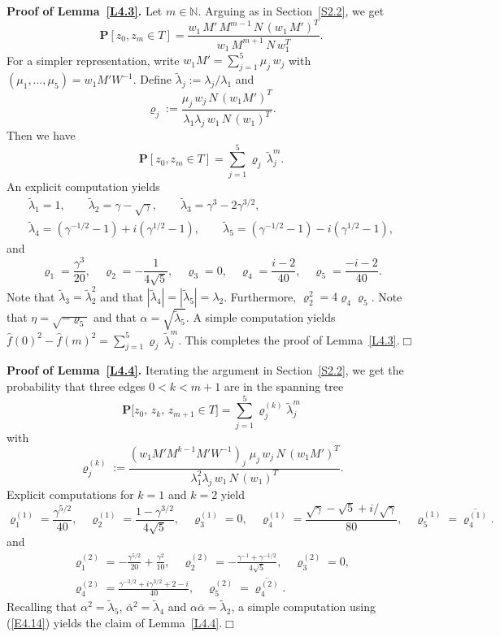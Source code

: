 \documentclass[11pt]{article}
\providecommand{\1}{\mathBB{1}}
\renewcommand{\P}{\mathbf{P}}
\newcommand{\N}{{\mathbb{N}}}
\def\hatf{\widehat f}
\newcommand{\equ}[1]{(\ref{#1})}
\providecommand{\eop}{{}\hfill {}\hfill{$\Box
$}\vspace{0.3cm}\pagebreak[2]\par}
\begin{document}
\textbf{Proof of Lemma~\ref{L4.3}.}
Let $m\in\N$.
Arguing as in Section~\ref{S2.2}, we get
\begin{equation}
\label{E4.13}
\P[z_0,z_m\in T]
=\frac{w_1\,M'\,M^{m-1}\,N\,(w_1\,M')^T}{w_1\,M^{m+1}\,N\,w_1^T}.
\end{equation}
For a simpler representation, write
$w_1M'=\sum_{j=1}^5\mu_j\,w_j$
with
$(\mu_1,\ldots,\mu_5)=w_1M'W^{-1}$.
Define $\tilde\lambda_j:=\lambda_j/\lambda_1$ and
$$\varrho_j:=
\frac{\mu_j\,w_j\,N\,(w_1M')^T}
{\lambda_1\lambda_j\,w_1\,N\,(w_1)^T}.
$$
Then we have
$$
\P[z_0,z_m\in T]=\sum_{j=1}^5\varrho_j\,\tilde\lambda_j^m.
$$
An explicit computation yields
$$\begin{gathered}
\tilde\lambda_1=1,\qquad
\tilde\lambda_2=\gamma-\sqrt{\gamma},\qquad
\tilde\lambda_3=\gamma^3-2\gamma^{3/2},\\[2mm]
\tilde\lambda_4=(\gamma^{-1/2}-1)+i(\gamma^{1/2}-1),\qquad
\tilde\lambda_5=(\gamma^{-1/2}-1)-i(\gamma^{1/2}-1),
\end{gathered}
$$
and
$$
\varrho_1=\frac{\gamma^3}{20},
\quad \varrho_2=-\frac{1}{4\sqrt{5}},
\quad \varrho_3=0,\quad \varrho_4=\frac{i-2}{40},
\quad\varrho_5=\frac{-i-2}{40}.
$$
Note that $\tilde\lambda_3=\tilde\lambda_2^2$ and that $|\tilde\lambda_4|=|\tilde\lambda_5|=\lambda_2$. Furthermore, $\varrho_2^2=4\varrho_4\varrho_5$.
Note that $\eta=\sqrt{-\varrho_5}$ and that $\alpha=\sqrt{\tilde\lambda_5}$.
A simple computation yields $\hatf(0)^2-\hatf(m)^2=\sum_{j=1}^5\varrho_j\,\tilde\lambda_j^m$.
This completes the proof of Lemma~\ref{L4.3}.\eop

\textbf{Proof of Lemma~\ref{L4.4}.}
Iterating the argument in Section~\ref{S2.2}, we get the probability that three edges $0<k<m+1$ are in the spanning tree
\begin{equation}
\label{E4.14}
\P\big[z_0,\,z_k,\,z_{m+1}\in T\big]=\sum_{j=1}^5\varrho^{(k)}_j\tilde\lambda_j^m
\end{equation}
with $$\varrho^{(k)}_j:=
\frac{(w_1M'M^{k-1}M'W^{-1})_j\;\mu_j\,w_j\,N\,(w_1M')^T}
{\lambda_1^2\lambda_j\,w_1\,N\,(w_1)^T}.
$$
Explicit computations for $k=1$ and $k=2$ yield
$$
\varrho^{(1)}_1=\frac{\gamma^{5/2}}{40},\quad
\varrho^{(1)}_2=\frac{1-\gamma^{3/2}}{4\sqrt5},\quad
\varrho^{(1)}_3=0,\quad
\varrho^{(1)}_4=\frac{\sqrt{\gamma}-\sqrt5+i/\sqrt{\gamma}}{80},\quad
\varrho^{(1)}_5=\overline{\varrho^{(1)}_4}.
$$
and
$$\begin{gathered}
\varrho^{(2)}_1=-\frac{\gamma^{5/2}}{20}+\frac{\gamma^2}{10},\quad
\varrho^{(2)}_2=-\frac{\gamma^{-1}+\gamma^{-1/2}}{4\sqrt5},\quad
\varrho^{(2)}_3=0,\\
\varrho^{(2)}_4=\frac{\gamma^{-3/2}+i\gamma^{3/2}+2-i}{40},\quad
\varrho^{(2)}_5=\overline{\varrho^{(2)}_4}.
\end{gathered}
$$Recalling that $\alpha^2=\tilde\lambda_5$, $\bar\alpha^2=\tilde\lambda_4$ and $\alpha\bar \alpha=\tilde\lambda_2$, a simple computation using \equ{E4.14} yields the claim of Lemma~\ref{L4.4}.\eop
\end{document}
